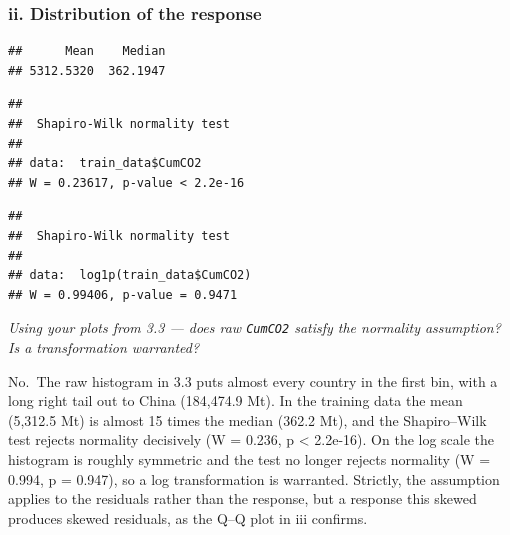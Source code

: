 \documentclass[
]{article}
\newenvironment{Shaded}{\begin{snugshade}}{\end{snugshade}}
\newcommand{\AttributeTok}[1]{\textcolor[rgb]{0.13,0.29,0.53}{#1}}
\newcommand{\CommentTok}[1]{\textcolor[rgb]{0.56,0.35,0.01}{\textit{#1}}}
\newcommand{\FunctionTok}[1]{\textcolor[rgb]{0.13,0.29,0.53}{\textbf{#1}}}
\newcommand{\NormalTok}[1]{#1}
\newcommand{\SpecialCharTok}[1]{\textcolor[rgb]{0.81,0.36,0.00}{\textbf{#1}}}
\begin{document}
\subsubsection{ii. Distribution of the
response}\label{ii.-distribution-of-the-response}

\begin{Shaded}
\end{Shaded}

\begin{verbatim}
##      Mean    Median 
## 5312.5320  362.1947
\end{verbatim}

\begin{Shaded}
\end{Shaded}

\begin{verbatim}
## 
##  Shapiro-Wilk normality test
## 
## data:  train_data$CumCO2
## W = 0.23617, p-value < 2.2e-16
\end{verbatim}

\begin{Shaded}
\end{Shaded}

\begin{verbatim}
## 
##  Shapiro-Wilk normality test
## 
## data:  log1p(train_data$CumCO2)
## W = 0.99406, p-value = 0.9471
\end{verbatim}

\emph{Using your plots from 3.3 --- does raw \texttt{CumCO2} satisfy the
normality assumption? Is a transformation warranted?}

No.~The raw histogram in 3.3 puts almost every country in the first bin,
with a long right tail out to China (184,474.9 Mt). In the training data
the mean (5,312.5 Mt) is almost 15 times the median (362.2 Mt), and the
Shapiro--Wilk test rejects normality decisively (W = 0.236, p
\textless{} 2.2e-16). On the log scale the histogram is roughly
symmetric and the test no longer rejects normality (W = 0.994, p =
0.947), so a log transformation is warranted. Strictly, the assumption
applies to the residuals rather than the response, but a response this
skewed produces skewed residuals, as the Q--Q plot in iii confirms.
\end{document}
